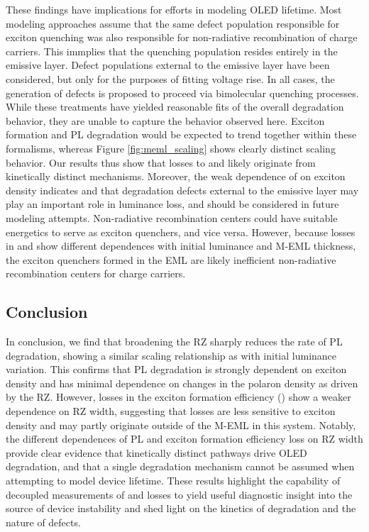 \documentclass[../thesis.tex]{subfiles}
\begin{document}
These findings have implications for efforts in modeling OLED lifetime. 
Most modeling approaches assume that the same defect population responsible for exciton quenching was also responsible for non-radiative recombination of charge carriers. 
This immplies that the quenching population resides entirely in the emissive layer.\supercite{Giebink2008a,Zhang2014}
Defect populations external to the emissive layer have been considered, but only for the purposes of fitting voltage rise.\supercite{Lee2017}
In all cases, the generation of defects is proposed to proceed via bimolecular quenching processes.
While these treatments have yielded reasonable fits of the overall degradation behavior, they are unable to capture the behavior observed here.
Exciton formation and PL degradation would be expected to trend together within these formalisms, whereas Figure \ref{fig:meml_scaling} shows clearly distinct scaling behavior. 
Our results thus show that losses to \pl and \ef likely originate from kinetically distinct mechanisms.  
Moreover, the weak dependence of \ef on exciton density indicates and that degradation defects external to the emissive layer may play an important role in luminance loss, and should be considered in future modeling attempts.
Non-radiative recombination centers could have suitable energetics to serve as exciton quenchers, and vice versa.
However, because losses in \ef and \pl show different dependences with initial luminance and M-EML thickness, the exciton quenchers formed in the EML are likely inefficient non-radiative recombination centers for charge carriers.

\subsection{Conclusion}

In conclusion, we find that broadening the RZ sharply reduces the rate of PL degradation, showing a similar scaling relationship as with initial luminance variation. 
This confirms that PL degradation is strongly dependent on exciton density and has minimal dependence on changes in the polaron density as driven by the RZ.  
However, losses in the exciton formation efficiency (\ef) show a weaker dependence on RZ width, suggesting that \ef losses are less sensitive to exciton density and may partly originate outside of the M-EML in this system. 
Notably, the different dependences of PL and exciton formation efficiency loss on RZ width provide clear evidence that kinetically distinct pathways drive OLED degradation, and that a single degradation mechanism cannot be assumed when attempting to model device lifetime. 
These results highlight the capability of decoupled measurements of \pl and \ef losses to yield useful diagnostic insight into the source of device instability and shed light on the kinetics of degradation and the nature of defects.
\end{document}
